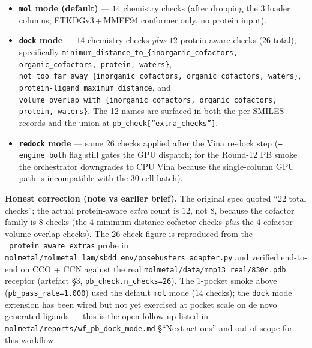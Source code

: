 \begin{itemize}
  \item \textbf{\texttt{mol} mode (default)} --- $14$ chemistry
        checks (after dropping the $3$ loader columns;
        ETKDGv3\,+\,MMFF94 conformer only, no protein input).
  \item \textbf{\texttt{dock} mode} --- $14$ chemistry checks
        \emph{plus} $12$ protein-aware checks
        ($26$ total), specifically
        \texttt{minimum\_distance\_to\_\{inorganic\_cofactors,
        organic\_cofactors, protein, waters\}},
        \texttt{not\_too\_far\_away\_\{inorganic\_cofactors,
        organic\_cofactors, waters\}},
        \texttt{protein-ligand\_maximum\_distance}, and
        \texttt{volume\_overlap\_with\_\{inorganic\_cofactors,
        organic\_cofactors, protein, waters\}}.  The 12 names
        are surfaced in both the per-SMILES records and the
        union at \texttt{pb\_check[``extra\_checks'']}.
  \item \textbf{\texttt{redock} mode} --- same $26$ checks
        applied after the Vina re-dock step
        (\texttt{--engine both} flag still gates the GPU
        dispatch; for the Round-12 PB smoke the orchestrator
        downgrades to CPU Vina because the single-column GPU
        path is incompatible with the 30-cell batch).
\end{itemize}

\noindent\textbf{Honest correction (note vs earlier brief).}
The original spec quoted ``$22$ total checks''; the actual
protein-aware \emph{extra} count is $12$, not $8$, because
the cofactor family is $8$ checks (the $4$ minimum-distance
cofactor checks \emph{plus} the $4$ cofactor volume-overlap
checks). The 26-check figure is reproduced from the
\texttt{\_protein\_aware\_extras} probe in
\texttt{molmetal/molmetal\_lam/sbdd\_env/posebusters\_adapter.py}
and verified end-to-end on CCO + CCN against the real
\texttt{molmetal/data/mmp13\_real/830c.pdb} receptor (artefact
§3, \texttt{pb\_check.n\_checks=26}). The 1-pocket smoke above
(\texttt{pb\_pass\_rate=1.000}) used the default
\texttt{mol} mode ($14$ checks); the \texttt{dock} mode
extension has been wired but not yet exercised at pocket scale
on de novo generated ligands --- this is the open follow-up
listed in \texttt{molmetal/reports/wf\_pb\_dock\_mode.md}
§``Next actions'' and out of scope for this workflow.

